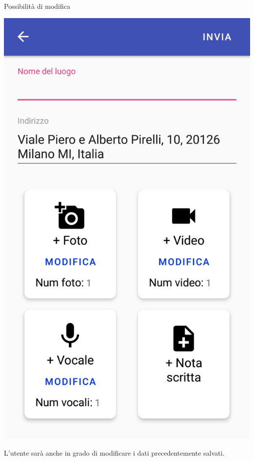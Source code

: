 \documentclass[11pt,aspectratio=169]{beamer}
\begin{document}
\begin{frame}{Possibilità di modifica}
\noindent
    \begin{minipage}{0.3\textwidth}
    \includegraphics[scale=0.1]{Tesi/images/HomepageModifica.jpg}
    \end{minipage}
\hfill
\begin{minipage}{0.6\textwidth}
L'utente sarà anche in grado di modificare i dati precedentemente salvati.
\end{minipage}
\end{frame}
\end{document}
